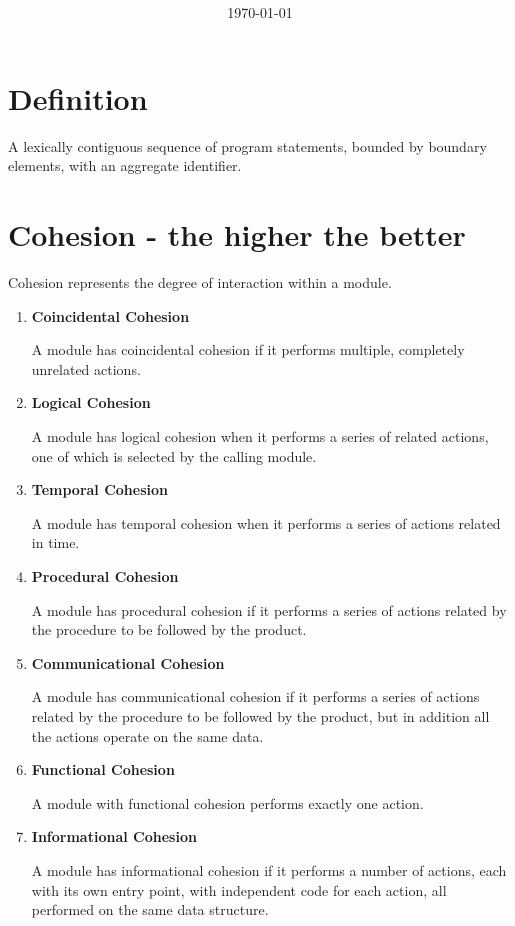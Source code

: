 \documentclass[11pt]{article}
\title{\textbf{\Topic}}
\author{\Name}
\date{\today}
\begin{document}
\maketitle
\noindent\makebox[\linewidth]{\rule[8pt]{5in}{0.5pt}}

\section*{Definition}

A lexically contiguous sequence of program statements, bounded by boundary elements, with an aggregate identifier.

\section*{Cohesion - the higher the better}

Cohesion represents the degree of interaction within a module. 

\begin{enumerate}
	\item \textbf{Coincidental Cohesion}
	
	A module has coincidental cohesion if it performs multiple, completely unrelated actions.
	
	\item \textbf{Logical Cohesion}
	
	A module has logical cohesion when it performs a series of related actions, one of which is selected by the calling module.
	
	\item \textbf{Temporal Cohesion}
	
	A module has temporal cohesion when it performs a series of actions related in time.
	
	\item \textbf{Procedural Cohesion}
	
	A module has procedural cohesion if it performs a series of actions related by the procedure to be followed by the product.

	\item \textbf{Communicational Cohesion}
	
	A module has communicational cohesion if it performs a series of actions related by the procedure to be followed by the product, but in addition all the actions operate on the same data.
	
	\item \textbf{Functional Cohesion}
	
	A module with functional cohesion performs exactly one action.
	
	\item \textbf{Informational Cohesion}
	
	A module has informational cohesion if it performs a number of actions, each with its own entry point, with independent code for each action, all performed on the same data structure.
	
\end{enumerate}
\end{document}
